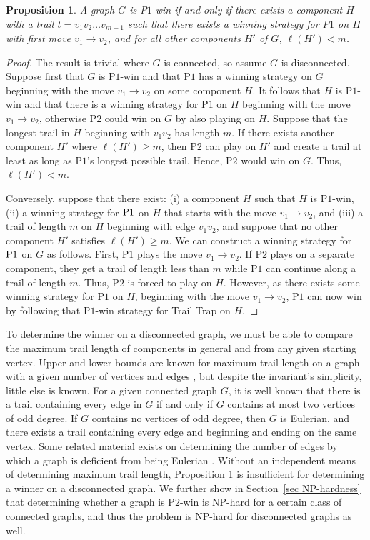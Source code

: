 \documentclass{article}
\theoremstyle{plain}
\newtheorem{proposition}[theorem]{Proposition}
\theoremstyle{definition}
\newcommand{\MaxTrail}{\ell}
\def\pone{{\rm{P}\ensuremath{1}}}
\def\ptwo{{\rm{P}\ensuremath{2}}}
\begin{document}
\begin{proposition}
\label{prop:disconnected}
    A graph $G$ is \pone{}-win if and only if there exists a component $H$ with a trail $t=v_1 v_2 \ldots v_{m+1}$ such that there exists a winning strategy for \pone{} on $H$ with first move $v_1\to v_2$, and for all other components $H'$ of $G$, $\MaxTrail(H')<m$.    
\end{proposition}
\begin{proof}    
    The result is trivial where $G$ is connected, so assume $G$ is disconnected. Suppose first that $G$ is \pone{}-win and that \pone{} has a winning strategy on $G$ beginning with the move $v_1\to v_2$ on some component $H$. It follows that $H$ is \pone{}-win and that there is a winning strategy for \pone{} on $H$ beginning with the move $v_1\to v_2$, otherwise \ptwo{} could win on $G$ by also playing on $H$. Suppose that the longest trail in $H$ beginning with $v_1v_2$ has length $m$. If there exists another component $H'$ where $\MaxTrail(H')\ge m$, then \ptwo{} can play on $H'$ and create a trail at least as long as \pone{}'s longest possible trail. Hence, \ptwo{} would win on $G$. Thus, $\MaxTrail(H')<m$.
    
    Conversely, suppose that there exist: (i) a component $H$ such that $H$ is \pone{}-win, (ii) a winning strategy for $\pone{}$ on $H$ that starts with the move $v_1\to v_2$, and (iii) a trail of length $m$ on $H$ beginning with edge $v_1v_2$, and suppose that no other component $H'$ satisfies $\MaxTrail(H')\ge m$. We can construct a winning strategy for $\pone{}$ on $G$ as follows. First, \pone{} plays the move $v_1\to v_2$. If \ptwo{} plays on a separate component, they get a trail of length less than $m$ while \pone{} can continue along a trail of length $m$. Thus, \ptwo{} is forced to play on $H$. However, as there exists some winning strategy for \pone{} on $H$, beginning with the move $v_1\to v_2$, \pone{} can now win by following that \pone{}-win strategy for {\sc Trail Trap} on $H$.
\end{proof}

To determine the winner on a disconnected graph, we must be able to compare the maximum trail length of components in general and from any given starting vertex. Upper and lower bounds are known for maximum trail length on a graph with a given number of vertices and edges \cite{BOLLOBAS198251}, but despite the invariant's simplicity, little else is known. For a given connected graph $G$, it is well known that there is a trail containing every edge in $G$ if and only if $G$ contains at most two vertices of odd degree. If $G$ contains no vertices of odd degree, then $G$ is Eulerian, and there exists a trail containing every edge and beginning and ending on the same vertex. Some related material exists on determining the number of edges by which a graph is deficient from being Eulerian \cite{BoSuTi77}. Without an independent means of determining maximum trail length, Proposition \ref{prop:disconnected} is insufficient for determining a winner on a disconnected graph. We further show in Section~{\ref{sec NP-hardness}} that determining whether a graph is \ptwo{}-win is NP-hard for a certain class of connected graphs, and thus the problem is NP-hard for disconnected graphs as well.
 
\end{document}
